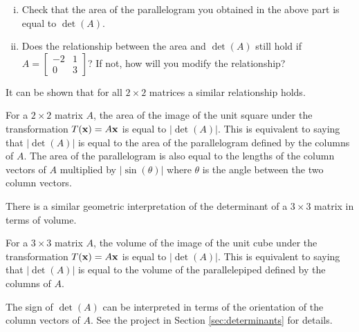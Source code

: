 \begin{activity}
\begin{enumerate}[i.]
		
\item Check that the area of the parallelogram you obtained in the above part is equal to $\det(A)$.



\item Does the relationship between the area and $\det(A)$ still hold if $A=\left[ \begin{array}{rc} -2&1\\ 0&3 \end{array} \right]$? If not, how will you modify the relationship?

 

\end{enumerate}
	
\ea

\end{activity}



It can be shown that for all $2\times 2$ matrices a similar relationship holds.




\begin{theorem}
For a $2\times 2$ matrix $A$, the area of the image of the unit square under the transformation $T(\mathbf{x})=A\mathbf{x}$ is equal to $|\det(A)|$. This is equivalent to saying that $|\det(A)|$ is equal to the area of the parallelogram defined by the columns of $A$. The area of the parallelogram is also equal to the lengths of the column vectors of $A$ multiplied by $|\sin(\theta)|$ where $\theta$ is the angle between the two column vectors.
\end{theorem}



There is a similar geometric interpretation of the determinant of a $3\times 3$ matrix in terms of volume.



\begin{theorem}
For a $3\times 3$ matrix $A$, the volume of the image of the unit cube under the transformation $T(\mathbf{x})=A\mathbf{x}$ is equal to $|\det(A)|$. This is equivalent to saying that $|\det(A)|$ is equal to the volume of the parallelepiped defined by the columns of $A$. 
\end{theorem}



The sign of $\det(A)$ can be interpreted in terms of the orientation of the column vectors of $A$. See the project in Section \ref{sec:determinants} for details. 



